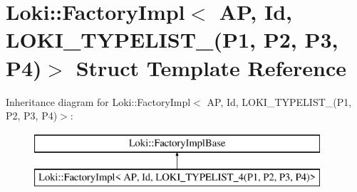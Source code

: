 \hypertarget{structLoki_1_1FactoryImpl_3_01AP_00_01Id_00_01LOKI__TYPELIST__4_07P1_00_01P2_00_01P3_00_01P4_08_4}{}\section{Loki\+:\+:Factory\+Impl$<$ A\+P, Id, L\+O\+K\+I\+\_\+\+T\+Y\+P\+E\+L\+I\+S\+T\+\_(P1, P2, P3, P4)$>$ Struct Template Reference}
\label{structLoki_1_1FactoryImpl_3_01AP_00_01Id_00_01LOKI__TYPELIST__4_07P1_00_01P2_00_01P3_00_01P4_08_4}
Inheritance diagram for Loki\+:\+:Factory\+Impl$<$ A\+P, Id, L\+O\+K\+I\+\_\+\+T\+Y\+P\+E\+L\+I\+S\+T\+\_(P1, P2, P3, P4)$>$\+:\begin{figure}[H]
\begin{center}
\leavevmode
\includegraphics[height=2.000000cm]{structLoki_1_1FactoryImpl_3_01AP_00_01Id_00_01LOKI__TYPELIST__4_07P1_00_01P2_00_01P3_00_01P4_08_4}
\end{center}
\end{figure}
